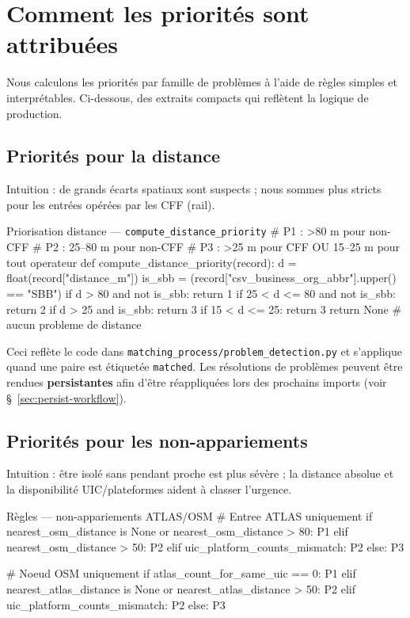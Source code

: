 \section{Comment les priorités sont attribuées}
Nous calculons les priorités par famille de problèmes à l'aide de règles simples et interprétables. Ci-dessous, des extraits compacts qui reflètent la logique de production.

\subsection{Priorités pour la distance}
Intuition : de grands écarts spatiaux sont suspects ; nous sommes plus stricts pour les entrées opérées par les CFF (rail).

\begin{codebox}[language=Python]{Priorisation distance — \texttt{compute\_distance\_priority}}
# P1 : >80 m pour non-CFF
# P2 : 25--80 m pour non-CFF
# P3 : >25 m pour CFF OU 15--25 m pour tout operateur
def compute_distance_priority(record):
    d = float(record["distance_m"])
    is_sbb = (record["csv_business_org_abbr"].upper() == "SBB")
    if d > 80 and not is_sbb:
        return 1
    if 25 < d <= 80 and not is_sbb:
        return 2
    if d > 25 and is_sbb:
        return 3
    if 15 < d <= 25:
        return 3
    return None  # aucun probleme de distance
\end{codebox}

\noindent Ceci reflète le code dans \texttt{matching\_process/problem\_detection.py} et s'applique quand une paire est étiquetée \texttt{matched}. Les résolutions de problèmes peuvent être rendues \textbf{persistantes} afin d'être réappliquées lors des prochains imports (voir \S~\ref{sec:persist-workflow}).

\subsection{Priorités pour les non-appariements}
Intuition : être isolé sans pendant proche est plus sévère ; la distance absolue et la disponibilité UIC/plateformes aident à classer l'urgence.

\begin{codebox}[language=Python]{Règles — non-appariements ATLAS/OSM}
# Entree ATLAS uniquement
if nearest_osm_distance is None or nearest_osm_distance > 80:
    P1
elif nearest_osm_distance > 50:
    P2
elif uic_platform_counts_mismatch:
    P2
else:
    P3

# Noeud OSM uniquement
if atlas_count_for_same_uic == 0:
    P1
elif nearest_atlas_distance is None or nearest_atlas_distance > 50:
    P2
elif uic_platform_counts_mismatch:
    P2
else:
    P3
\end{codebox}

